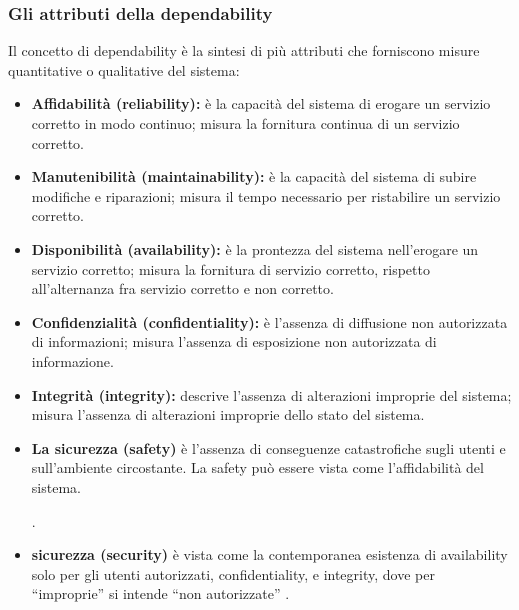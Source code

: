 \documentclass[14pt]{extarticle}
\begin{document}
\subsubsection{Gli attributi della dependability}
Il concetto di dependability è la sintesi di più attributi che forniscono misure
quantitative o qualitative del sistema:
\begin{itemize}
\item \textbf{Affidabilità (reliability):} è la capacità del sistema di erogare un servizio corretto in modo continuo; misura la fornitura continua di un servizio
corretto.
\item \textbf{Manutenibilità (maintainability):} è la capacità del sistema di subire modifiche e riparazioni; misura il tempo necessario per ristabilire un servizio
corretto.
\item \textbf{Disponibilità (availability):} è la prontezza del sistema nell'erogare un
servizio corretto; misura la fornitura di servizio corretto, rispetto all'alternanza fra servizio corretto e non corretto.
\item \textbf{Confidenzialità (confidentiality):} è l'assenza di diffusione non autorizzata di informazioni; misura l'assenza di esposizione non autorizzata di
informazione.
\item \textbf{Integrità (integrity):} descrive l'assenza di alterazioni improprie del sistema; misura l’assenza di alterazioni improprie dello stato del sistema.
\item \textbf{La sicurezza (safety)} è l'assenza di conseguenze catastrofiche sugli
utenti e sull'ambiente circostante. La safety può essere vista come l'affidabilità
del sistema. .
\item \textbf{sicurezza (security)} è vista come la contemporanea esistenza di availability solo per gli utenti autorizzati, confidentiality, e
integrity, dove per “improprie” si intende “non autorizzate” \cite{nicol2004model}.
\end{itemize}
\end{document}
